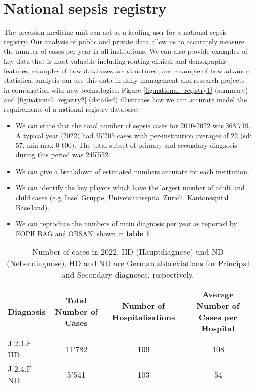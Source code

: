 

\section{National sepsis registry}
The precision medicine unit can act as a leading user for a national sepsis registry.
Our analysis of public and private data allow us to accurately measure the number of cases per year in all institutions.
We can also provide examples of key data that is most valuable including routing clinical and demographic features, examples of how databases are structured, and example of how advance statistical analysis can use this data in daily management and research projects in combination with new technologies. 
Figure 
\ref{fig:national_registry1} (summary) and \ref{fig:national_registry2} (detailed)
 illustrates how we can accurate model the requirements of a national registry database:

\begin{itemize}
\item We can state that the total number of sepsis cases for 2010-2022 was 368'719. A typical year (2022) had 35'205 cases with per-institution averages of 22 (sd: 57, min-max 0-600). The total subset of primary and secondary diagnosis during this period was 245'552.
\item We can give a breakdown of estimated numbers accurate for each institution.
\item We can identify the key players which have the largest number of adult and child cases (e.g. Insel Gruppe, Universitatsspital Zurich, Kantonsspital Baselland).
\item We can reproduce the numbers of main diagnosis per year as reported by FOPH BAG and OBSAN, shown in \textbf{table \ref{tab:year_report}}.
\end{itemize}

\begin{table}[h!]
\centering
\caption{Number of cases in 2022. HD (Hauptdiagnose) und ND (Nebendiagnose), HD and ND are German abbreviations for Principal and Secondary diagnoses, respectively.}
\label{tab:number_of_cases}
\begin{tabular}{lccc}
\hline
\textbf{Diagnosis} & \textbf{Total Number of Cases} & \textbf{Number of Hospitalisations} & \textbf{Average Number of Cases per Hospital} \\
\hline
J.2.1.F HD & 11'782 & 109 & 108 \\
J.2.4.F ND & 5'541 & 103 & 54 \\
\hline
\end{tabular}
    \label{tab:year_report}
\end{table}

